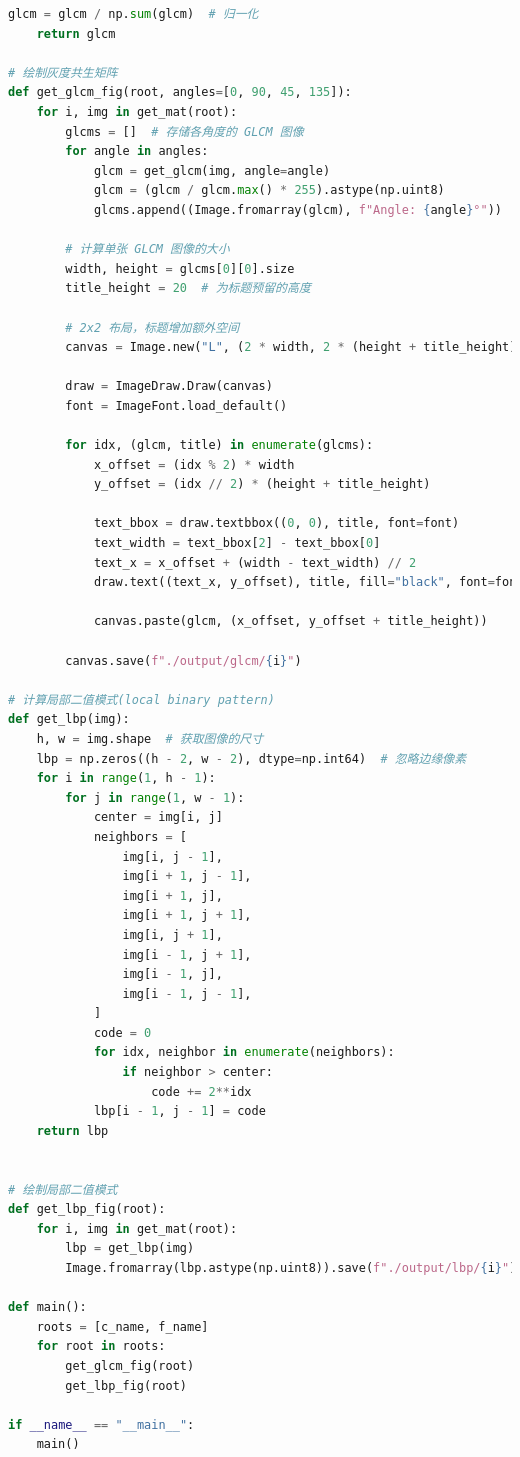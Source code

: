 \documentclass[a4paper,12pt]{report}
\begin{document}
\begin{lstlisting}[language=Python]
    glcm = glcm / np.sum(glcm)  # 归一化
    return glcm

# 绘制灰度共生矩阵
def get_glcm_fig(root, angles=[0, 90, 45, 135]):
    for i, img in get_mat(root):
        glcms = []  # 存储各角度的 GLCM 图像
        for angle in angles:
            glcm = get_glcm(img, angle=angle)
            glcm = (glcm / glcm.max() * 255).astype(np.uint8)
            glcms.append((Image.fromarray(glcm), f"Angle: {angle}°"))  # 保存图像和标题

        # 计算单张 GLCM 图像的大小
        width, height = glcms[0][0].size
        title_height = 20  # 为标题预留的高度

        # 2x2 布局，标题增加额外空间
        canvas = Image.new("L", (2 * width, 2 * (height + title_height)), "white")

        draw = ImageDraw.Draw(canvas)
        font = ImageFont.load_default()

        for idx, (glcm, title) in enumerate(glcms):
            x_offset = (idx % 2) * width
            y_offset = (idx // 2) * (height + title_height)

            text_bbox = draw.textbbox((0, 0), title, font=font)
            text_width = text_bbox[2] - text_bbox[0]
            text_x = x_offset + (width - text_width) // 2
            draw.text((text_x, y_offset), title, fill="black", font=font)

            canvas.paste(glcm, (x_offset, y_offset + title_height))

        canvas.save(f"./output/glcm/{i}")

# 计算局部二值模式(local binary pattern)
def get_lbp(img):
    h, w = img.shape  # 获取图像的尺寸
    lbp = np.zeros((h - 2, w - 2), dtype=np.int64)  # 忽略边缘像素
    for i in range(1, h - 1):
        for j in range(1, w - 1):
            center = img[i, j]
            neighbors = [
                img[i, j - 1],
                img[i + 1, j - 1],
                img[i + 1, j],
                img[i + 1, j + 1],
                img[i, j + 1],
                img[i - 1, j + 1],
                img[i - 1, j],
                img[i - 1, j - 1],
            ]
            code = 0
            for idx, neighbor in enumerate(neighbors):
                if neighbor > center:
                    code += 2**idx
            lbp[i - 1, j - 1] = code
    return lbp


# 绘制局部二值模式
def get_lbp_fig(root):
    for i, img in get_mat(root):
        lbp = get_lbp(img)
        Image.fromarray(lbp.astype(np.uint8)).save(f"./output/lbp/{i}")

def main():
    roots = [c_name, f_name]
    for root in roots:
        get_glcm_fig(root)
        get_lbp_fig(root)

if __name__ == "__main__":
    main()

\end{lstlisting}
\clearpage
\end{document}
